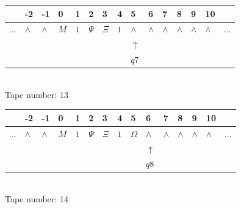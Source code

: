 \documentclass[11pt]{article}
\begin{document}
\begin{table}[H]
\centering
\begin{tabular}{lllllllllllllll}
 & -2 & -1 & 0 & 1 & 2 & 3 & 4 & 5 & 6 & 7 & 8 & 9 & 10 & \\
\hline
$...$ & \multicolumn{1}{|l|}{$\wedge$} & \multicolumn{1}{|l|}{$\wedge$} & \multicolumn{1}{|l|}{$M$} & \multicolumn{1}{|l|}{$1$} & \multicolumn{1}{|l|}{$\Psi$} & \multicolumn{1}{|l|}{$\Xi$} & \multicolumn{1}{|l|}{$1$} & \multicolumn{1}{|l|}{$\wedge$} & \multicolumn{1}{|l|}{$\wedge$} & \multicolumn{1}{|l|}{$\wedge$} & \multicolumn{1}{|l|}{$\wedge$} & \multicolumn{1}{|l|}{$\wedge$} & \multicolumn{1}{|l|}{$\wedge$} & $...$\\
\hline
&  &  &  &  &  &  &  & $\uparrow$ &  &  &  &  &  &  \\
&  &  &  &  &  &  &  & $ q7 $ &  &  &  &  &  &  \\
\end{tabular}
\\
Tape number: 13
\noindent\makebox[\linewidth]{\hdashrule{\textwidth}{1pt}{1pt}}\end{table}

\begin{table}[H]
\centering
\begin{tabular}{lllllllllllllll}
 & -2 & -1 & 0 & 1 & 2 & 3 & 4 & 5 & 6 & 7 & 8 & 9 & 10 & \\
\hline
$...$ & \multicolumn{1}{|l|}{$\wedge$} & \multicolumn{1}{|l|}{$\wedge$} & \multicolumn{1}{|l|}{$M$} & \multicolumn{1}{|l|}{$1$} & \multicolumn{1}{|l|}{$\Psi$} & \multicolumn{1}{|l|}{$\Xi$} & \multicolumn{1}{|l|}{$1$} & \multicolumn{1}{|l|}{$\Omega$} & \multicolumn{1}{|l|}{$\wedge$} & \multicolumn{1}{|l|}{$\wedge$} & \multicolumn{1}{|l|}{$\wedge$} & \multicolumn{1}{|l|}{$\wedge$} & \multicolumn{1}{|l|}{$\wedge$} & $...$\\
\hline
&  &  &  &  &  &  &  &  & $\uparrow$ &  &  &  &  &  \\
&  &  &  &  &  &  &  &  & $ q8 $ &  &  &  &  &  \\
\end{tabular}
\\
Tape number: 14
\noindent\makebox[\linewidth]{\hdashrule{\textwidth}{1pt}{1pt}}\end{table}
\end{document}
